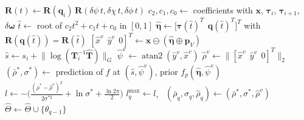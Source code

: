 \begin{algorithm}[H]
\begin{algorithmic}[1]
        \State $\mathbf{R}(t) \gets \mathbf{R}(\mathbf{q}_i)\,\mathbf{R}(\delta\psi\, t, \delta\chi\, t, \delta\phi\, t)$
        \State $c_2, c_1, c_0 \gets$ coefficients with $\mathbf{x}$, $\boldsymbol{\tau}_i$, $\boldsymbol{\tau}_{i+1}$, $\delta\boldsymbol{\omega}$
        \State $\hat{t} \gets$ root of $c_2 t^2 + c_1 t + c_0$ in $[0, 1]$
        \State $\hat{\boldsymbol{\eta}} \gets \big[\boldsymbol{\tau}(\hat{t})^T\ \ \mathbf{q}(\hat{t})^T\big]^T$
               with $\mathbf{R}(\mathbf{q}(\hat{t})) = \mathbf{R}(\hat{t})$
        \State $[\hat{x}^v\ \ \hat{y}^v\ \ 0]^T \gets \mathbf{x} \ominus (\hat{\boldsymbol{\eta}} \oplus \mathbf{p}_V)$
        \State $\hat{s} \gets s_i + \lVert \log(\mathbf{T}_i^{-1}\hat{\mathbf{T}}) \rVert_G$
        \State $\hat{\psi}^v \gets \operatorname{atan2}(\hat{y}^v, \hat{x}^v)$
        \State $\hat{\rho}^v \gets \lVert [\hat{x}^v\ \ \hat{y}^v\ \ 0]^T \rVert_2$
        \State $(\bar{\rho}^{*}, \sigma^{*}) \gets$ prediction of $f$ at $(\hat{s}, \hat{\psi}^v)$, prior $f_p(\hat{\boldsymbol{\eta}}, \hat{\psi}^v)$
        \State $l \gets -\Big(\frac{(\bar{\rho}^{*} - \hat{\rho}^v)^2}{2\sigma^{*2}} + \ln\sigma^{*} + \frac{\ln 2\pi}{2}\Big)$
          \State $l^{\max}_q \gets l$, \ $(\bar{\rho}_q, \sigma_q, \hat{\rho}_q) \gets (\bar{\rho}^{*}, \sigma^{*}, \hat{\rho}^v)$
        \EndIf
      \EndFor
        \State $\hat{\Theta} \gets \hat{\Theta} \cup \{\theta_{q-1}\}$
      \EndIf
    \EndFor
  \end{algorithmic}
\end{algorithm}

